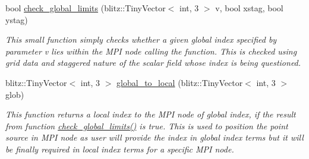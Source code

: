\begin{DoxyCompactItemize}
bool \hyperlink{classmaxwell_a48fd72db7c410c42ad5a94d311ef3cb0}{check\+\_\+global\+\_\+limits} (blitz\+::\+Tiny\+Vector$<$ int, 3 $>$ v, bool xstag, bool ystag)
\begin{DoxyCompactList}\small\item\em This small function simply checks whether a given global index specified by parameter v lies within the M\+PI node calling the function. This is checked using grid data and staggered nature of the scalar field whose index is being questioned. \end{DoxyCompactList}\item 
blitz\+::\+Tiny\+Vector$<$ int, 3 $>$ \hyperlink{classmaxwell_ac6584903e581c7a4b05eb12632dfda28}{global\+\_\+to\+\_\+local} (blitz\+::\+Tiny\+Vector$<$ int, 3 $>$ glob)
\begin{DoxyCompactList}\small\item\em This function returns a local index to the M\+PI node of global index, if the result from function \hyperlink{classmaxwell_a48fd72db7c410c42ad5a94d311ef3cb0}{check\+\_\+global\+\_\+limits()} is true. This is used to position the point source in M\+PI node as user will provide the index in global index terms but it will be finally required in local index terms for a specific M\+PI node. \end{DoxyCompactList}\end{DoxyCompactItemize}
